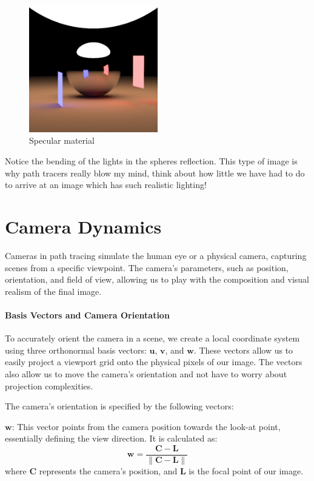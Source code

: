 \documentclass[12pt]{article}
\begin{document}
\begin{figure}[H]
    \centering
    \includegraphics[width=0.5\textwidth]{images/artsy_rep/specular_sphere.png}
    \caption{Specular material}
    \label{fig:specmat}
\end{figure}

Notice the bending of the lights in the spheres reflection. This type of image is why path tracers really blow my mind, think about how little we have had to do to arrive at an image which has such realistic lighting!

\section{Camera Dynamics}
\label{sec:camera}

Cameras in path tracing simulate the human eye or a physical camera, capturing scenes from a specific viewpoint. The camera's parameters, such as position, orientation, and field of view, allowing us to play with the composition and visual realism of the final image.

\paragraph{Basis Vectors and Camera Orientation}
To accurately orient the camera in a scene, we create a local coordinate system using three orthonormal basis vectors: \(\mathbf{u}\), \(\mathbf{v}\), and \(\mathbf{w}\). These vectors allow us to easily project a viewport grid onto the physical pixels of our image. The vectors also allow us to move the camera's orientation and not have to worry about projection complexities.

The camera's orientation is specified by the following vectors:

\(\mathbf{w}\): This vector points from the camera position towards the look-at point, essentially defining the view direction. It is calculated as:
\[
    \mathbf{w} = \frac{\mathbf{C} - \mathbf{L}}{\|\mathbf{C} - \mathbf{L}\|}
\]
where \(\mathbf{C}\) represents the camera's position, and \(\mathbf{L}\) is the focal point of our image.
\end{document}

